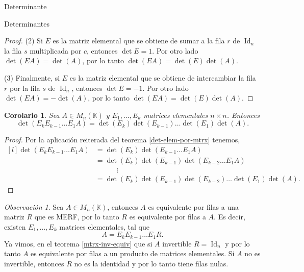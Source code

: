 \documentclass[a4paper,12pt,twoside,spanish,reqno]{amsbook}
\newtheorem{corolario}[teorema]{Corolario}
\theoremstyle{definition}
\theoremstyle{remark}
\newtheorem{obs}{Observaci\'on}[section]
\newcommand{\Id}{\operatorname{Id}}
\newcommand{\K}{\mathbb K}
\begin{document}
\begin{chapter}{Determinante}
\begin{section}{Determinantes}
\begin{proof}
		 	
		 	(2) Si $E$ es la matriz elemental que se obtiene de sumar a la fila $r$ de $\Id_n$  la fila $s$ multiplicada por $c$, entonces $\det E =1$. Por  otro lado  $\det(EA) = \det(A)$, por lo tanto  $\det(EA) = \det(E)\det(A)$.
		 	
		 	(3) Finalmente, si $E$ es la matriz elemental que se obtiene de intercambiar la fila $r$ por la fila $s$ de $\Id_n$, entonces $\det E=-1$. Por  otro lado  $\det(EA) = -\det(A)$, por lo tanto  $\det(EA) = \det(E)\det(A)$.
		 \end{proof}
		 
		 \begin{corolario}\label{coro-det-prod-elem-mtrx}
		 	Sea $A  \in M_n(\K)$ y $E_1,\ldots,E_k$ matrices elementales $n \times n$. Entonces
		 	\begin{equation*}
		 	\det (E_kE_{k-1}\ldots E_1A) = \det (E_k) \det (E_{k-1})\ldots \det (E_1) \det (A).
		 	\end{equation*}  
		 \end{corolario}
		 \begin{proof}
		 	Por  la aplicación reiterada del teorema \ref{det-elem-por-mtrx} tenemos, 
		 	\begin{equation*}
		 	\begin{matrix*}[l]
		 	\det (E_kE_{k-1}\ldots E_1A) &= \det (E_k) \det(E_{k-1}\ldots E_1 A) \\
		 	&= \det( E_k) \det(E_{k-1})\det(E_{k-2}\ldots E_1A) \\
		 	&\qquad\quad \vdots \\
		 	& = \det( E_k) \det(E_{k-1})\det(E_{k-2})\ldots \det(E_1) \det(A).
		 	\end{matrix*}		
		 	\end{equation*}
		 \end{proof}
		 
		 
		 \begin{obs}\label{mtrx-elem-por-merf}
		 	Sea $A  \in M_n(\K)$,  entonces $A$ es equivalente por filas a una matriz $R$ que es  MERF, por lo tanto $R$ es equivalente por filas a $A$. Es decir, existen $E_1,\ldots,E_k$ matrices elementales, tal que
		 	\begin{equation}
		 	A = E_kE_{k-1}\ldots E_1R.
		 	\end{equation}
		 	Ya vimos,  en el  teorema \ref{mtrx-inv-equiv} que si $A$ invertible $R= \Id_n$ y por lo tanto  $A$ es equivalente por filas a un producto de  matrices elementales. Si $A$ no es invertible, entonces $R$ no es la identidad y por lo tanto tiene filas nulas. 
		 \end{obs}
		

\end{section}
\end{chapter}
\end{document}
